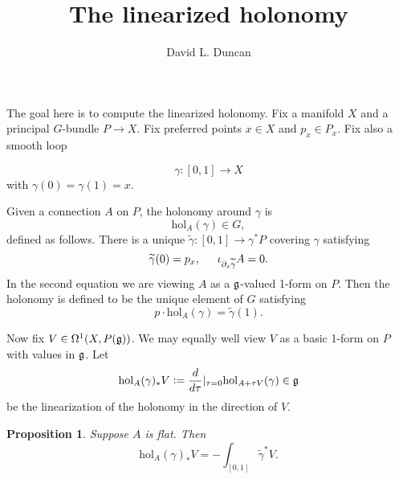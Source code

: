 \documentclass{article}
\title{The linearized holonomy}
\author{David L. Duncan}
\date{}
\newtheorem{proposition}[theorem]{Proposition}
\newcommand{\intd}[1]{\displaystyle \int_{#1}}
\newcommand{\defeq}{\mathrel{\mathpalette{\vcenter{\hbox{$:$}}}=}}
\newcommand{\hol}{{\mathrm{hol}}}
\begin{document}
\maketitle




\begin{abstract}



\end{abstract}




\tableofcontents



The goal here is to compute the linearized holonomy. Fix a manifold $X$ and a principal $G$-bundle $P \rightarrow X$. Fix preferred points $x \in X$ and $p_x \in P_x$. Fix also a smooth loop

$$\gamma: \left[0, 1 \right] \longrightarrow X$$
with $\gamma(0) = \gamma(1) = x$. 

Given a connection $A$ on $P$, the holonomy around $\gamma$ is
$$\hol_A(\gamma) \in  G,$$
defined as follows. There is a unique $\widetilde{\gamma}: \left[0, 1 \right] \rightarrow \gamma^*P$ covering $\gamma$ satisfying
$$\widetilde{\gamma}(0) = p_x, \indent \iota_{\partial_s \widetilde{\gamma}} A = 0.$$
In the second equation we are viewing $A$ as a $\frak{g}$-valued 1-form on $P$. Then the holonomy is defined to be the unique element of $G$ satisfying
$$p \cdot \hol_A(\gamma) = \widetilde{\gamma}(1).$$


Now fix $V \in  \Omega^1(X, P(\frak{g}))$. We may equally well view $V$ as a basic 1-form on $P$ with values in $\frak{g}$. Let 
$$\hol_A(\gamma)_* V  \defeq \frac{d}{ d \tau} \vert_{\tau = 0} \hol_{A + \tau V} (\gamma) \in \frak{g}$$ 
be the linearization of the holonomy in the direction of $V$.

\begin{proposition}
Suppose $A$ is flat. Then
$$\hol_A(\gamma)_* V = - \intd{\left[0, 1 \right]} \widetilde{\gamma}^* V.$$
\end{proposition}
\end{document}
